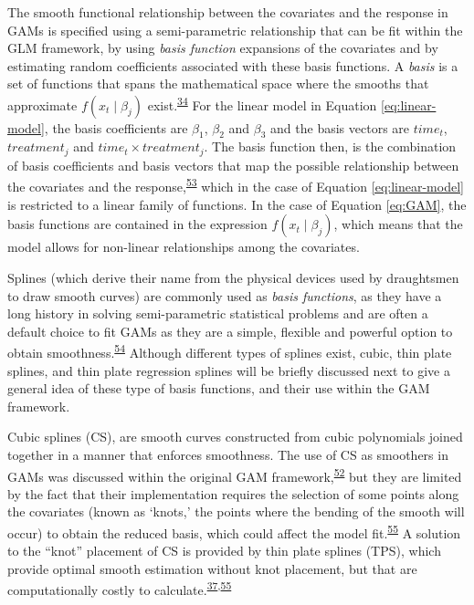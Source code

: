 \documentclass[
]{article}
\begin{document}
The smooth functional relationship between the covariates and the response in GAMs is specified using a semi-parametric relationship that can be fit within the GLM framework, by using \emph{basis function} expansions of the covariates and by estimating random coefficients associated with these basis functions. A \emph{basis} is a set of functions that spans the mathematical space where the smooths that approximate \(f(x_t\mid \beta_j)\) exist.\textsuperscript{\protect\hyperlink{ref-simpson2018}{34}} For the linear model in Equation \eqref{eq:linear-model}, the basis coefficients are \(\beta_1\), \(\beta_2\) and \(\beta_3\) and the basis vectors are \(time_t\), \(treatment_j\) and \(time_t \times treatment_j\). The basis function then, is the combination of basis coefficients and basis vectors that map the possible relationship between the covariates and the response,\textsuperscript{\protect\hyperlink{ref-hefley2017}{53}} which in the case of Equation \eqref{eq:linear-model} is restricted to a linear family of functions. In the case of Equation \eqref{eq:GAM}, the basis functions are contained in the expression \(f(x_t\mid \beta_j)\), which means that the model allows for non-linear relationships among the covariates.

Splines (which derive their name from the physical devices used by draughtsmen to draw smooth curves) are commonly used as \emph{basis functions}, as they have a long history in solving semi-parametric statistical problems and are often a default choice to fit GAMs as they are a simple, flexible and powerful option to obtain smoothness.\textsuperscript{\protect\hyperlink{ref-wegman1983}{54}} Although different types of splines exist, cubic, thin plate splines, and thin plate regression splines will be briefly discussed next to give a general idea of these type of basis functions, and their use within the GAM framework.

Cubic splines (CS), are smooth curves constructed from cubic polynomials joined together in a manner that enforces smoothness. The use of CS as smoothers in GAMs was discussed within the original GAM framework,\textsuperscript{\protect\hyperlink{ref-hastie1987}{52}} but they are limited by the fact that their implementation requires the selection of some points along the covariates (known as `knots,' the points where the bending of the smooth will occur) to obtain the reduced basis, which could affect the model fit.\textsuperscript{\protect\hyperlink{ref-wood2003}{55}} A solution to the ``knot'' placement of CS is provided by thin plate splines (TPS), which provide optimal smooth estimation without knot placement, but that are computationally costly to calculate.\textsuperscript{\protect\hyperlink{ref-wood2017}{37},\protect\hyperlink{ref-wood2003}{55}}
\end{document}
